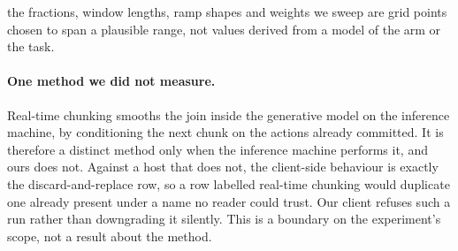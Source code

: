 \unjustified{} the fractions, window lengths, ramp shapes and weights we sweep
are grid points chosen to span a plausible range, not values derived from a
model of the arm or the task.

\paragraph{One method we did not measure.}
Real-time chunking smooths the join inside the generative model on the
inference machine, by conditioning the next chunk on the actions already
committed. It is therefore a distinct method only when the inference machine
performs it, and ours does not. Against a host that does not, the client-side
behaviour is exactly the discard-and-replace row, so a row labelled real-time
chunking would duplicate one already present under a name no reader could
trust. Our client refuses such a run rather than downgrading it silently. This
is a boundary on the experiment's scope, not a result about the method.
